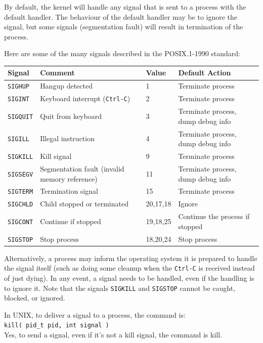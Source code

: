 By default, the kernel will handle any signal that is sent to a process with the default handler. The behaviour of the default handler may be to ignore the signal, but some signals (segmentation fault) will result in termination of the process. 


Here are some of the many signals described in the POSIX.1-1990 standard:

\begin{center}
\begin{tabular}{l|l|l|l}
	\textbf{Signal} & \textbf{Comment} & \textbf{Value} & \textbf{Default Action}\\ \hline
	\texttt{SIGHUP} & Hangup detected & 1 & Terminate process \\
	\texttt{SIGINT} & Keyboard interrupt (\texttt{Ctrl-C}) & 2 & Terminate process \\
	\texttt{SIGQUIT} & Quit from keyboard & 3 & Terminate process, dump debug info  \\
	\texttt{SIGILL} & Illegal instruction & 4 & Terminate process, dump debug info \\
	\texttt{SIGKILL} & Kill signal & 9 & Terminate process \\
	\texttt{SIGSEGV} & Segmentation fault (invalid memory reference) & 11 & Terminate process, dump debug info\\
	\texttt{SIGTERM} & Termination signal & 15 & Terminate process \\
	\texttt{SIGCHLD} & Child stopped or terminated & 20,17,18 & Ignore \\
	\texttt{SIGCONT} & Continue if stopped & 19,18,25 & Continue the process if stopped \\
	\texttt{SIGSTOP} & Stop process & 18,20,24 & Stop process \\
\end{tabular}
\end{center}


Alternatively, a process may inform the operating system it is prepared to handle the signal itself (such as doing some cleanup when the \texttt{Ctrl-C} is received instead of just dying). In any event, a signal needs to be handled, even if the handling is to ignore it. Note that the signals \texttt{SIGKILL} and \texttt{SIGSTOP} cannot be caught, blocked, or ignored.

In UNIX, to deliver a signal to a process, the command is:\\
\texttt{kill( pid\_t pid, int signal )}\\
Yes, to send a signal, even if it's not a kill signal, the command is kill.

